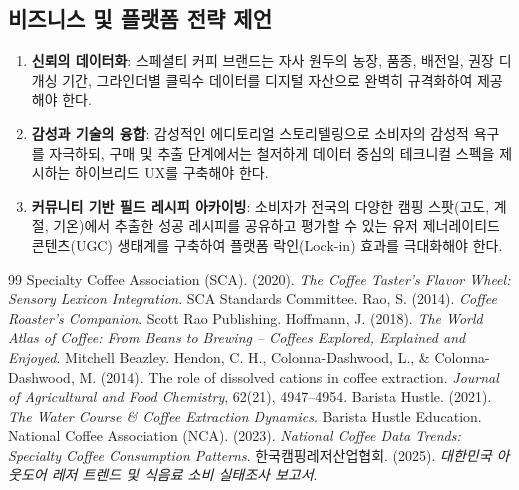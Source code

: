 \documentclass[10pt,a4paper]{article}
\begin{document}
\subsection{비즈니스 및 플랫폼 전략 제언}
\begin{enumerate}[itemsep=3pt]
    \item \textbf{신뢰의 데이터화}: 스페셜티 커피 브랜드는 자사 원두의 농장, 품종, 배전일, 권장 디개싱 기간, 그라인더별 클릭수 데이터를 디지털 자산으로 완벽히 규격화하여 제공해야 한다.
    \item \textbf{감성과 기술의 융합}: 감성적인 에디토리얼 스토리텔링으로 소비자의 감성적 욕구를 자극하되, 구매 및 추출 단계에서는 철저하게 데이터 중심의 테크니컬 스펙을 제시하는 하이브리드 UX를 구축해야 한다.
    \item \textbf{커뮤니티 기반 필드 레시피 아카이빙}: 소비자가 전국의 다양한 캠핑 스팟(고도, 계절, 기온)에서 추출한 성공 레시피를 공유하고 평가할 수 있는 유저 제너레이티드 콘텐츠(UGC) 생태계를 구축하여 플랫폼 락인(Lock-in) 효과를 극대화해야 한다.
\end{enumerate}

\begin{thebibliography}{99}
 Specialty Coffee Association (SCA). (2020). \textit{The Coffee Taster's Flavor Wheel: Sensory Lexicon Integration}. SCA Standards Committee.
 Rao, S. (2014). \textit{Coffee Roaster's Companion}. Scott Rao Publishing.
 Hoffmann, J. (2018). \textit{The World Atlas of Coffee: From Beans to Brewing -- Coffees Explored, Explained and Enjoyed}. Mitchell Beazley.
 Hendon, C. H., Colonna-Dashwood, L., \& Colonna-Dashwood, M. (2014). The role of dissolved cations in coffee extraction. \textit{Journal of Agricultural and Food Chemistry}, 62(21), 4947--4954.
 Barista Hustle. (2021). \textit{The Water Course \& Coffee Extraction Dynamics}. Barista Hustle Education.
 National Coffee Association (NCA). (2023). \textit{National Coffee Data Trends: Specialty Coffee Consumption Patterns}.
 한국캠핑레저산업협회. (2025). \textit{대한민국 아웃도어 레저 트렌드 및 식음료 소비 실태조사 보고서}.
\end{thebibliography}
\end{document}
